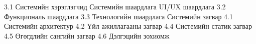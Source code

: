 




% 

% 

% 


% 





3.1 Системийн хэрэглэгчид 
Системийн шаардлага
    UI/UX шаардлага 
    3.2 Функциональ шаардлага
    3.3 Технологийн шаардлага
Системийн загвар
    4.1 Системийн архитектур
    4.2 Үйл ажиллагааны загвар
    4.4 Системийн статик загвар
    4.5 Өгөгдлийн сангийн загвар
    4.6 Дэлгэцийн зохиомж
